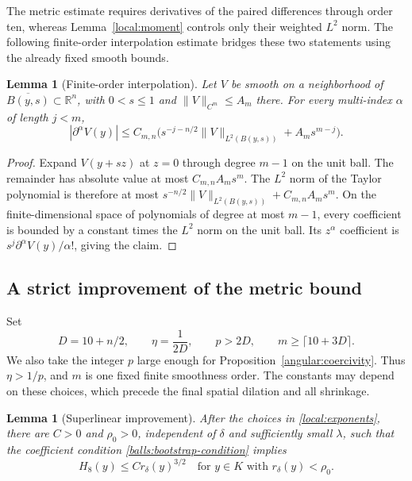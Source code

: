 \documentclass[11pt]{article}
\newtheorem{lemma}[theorem]{Lemma}
\theoremstyle{definition}
\theoremstyle{remark}
\numberwithin{equation}{section}
\begin{document}
The metric estimate requires derivatives of the paired differences
through order ten, whereas Lemma~\ref{local:moment} controls only their
weighted $L^2$ norm.  The following finite-order interpolation estimate
bridges these two statements using the already fixed smooth bounds.

\begin{lemma}[Finite-order interpolation]\label{local:interpolation}
Let $V$ be smooth on a neighborhood of $\overline{B(y,s)}\subset
\mathbb R^n$, with $0<s\leq1$ and $\|V\|_{C^m}\leq A_m$ there.
For every multi-index $\alpha$ of length $j<m$,
\begin{equation}\label{local:interpolation-estimate}
 |\partial^\alpha V(y)|\leq C_{m,n}
 \bigl(s^{-j-n/2}\|V\|_{L^2(B(y,s))}
                          +A_m s^{m-j}\bigr).
\end{equation}
\end{lemma}

\begin{proof}
Expand $V(y+sz)$ at $z=0$ through degree $m-1$ on the unit ball.
The remainder has absolute value at most $C_{m,n}A_m s^m$.
The $L^2$ norm of the Taylor polynomial is therefore at most
$s^{-n/2}\|V\|_{L^2(B(y,s))}+C_{m,n}A_m s^m$.
On the finite-dimensional space of polynomials of degree at most
$m-1$, every coefficient is bounded by a constant times the $L^2$
norm on the unit ball.  Its $z^\alpha$ coefficient is
$s^j\partial^\alpha V(y)/\alpha!$, giving the claim.
\end{proof}

\subsection{A strict improvement of the metric bound}

Set
\begin{equation}\label{local:exponents}
 D=10+n/2,\qquad \eta=\frac1{2D},\qquad
 p>2D,\qquad m\geq\lceil10+3D\rceil.
\end{equation}
We also take the integer $p$ large enough for
Proposition~\ref{angular:coercivity}.  Thus $\eta>1/p$, and $m$ is
one fixed finite smoothness order.  The constants may depend on these
choices, which precede the final spatial dilation and all shrinkage.

\begin{lemma}[Superlinear improvement]\label{local:improvement}
After the choices in \eqref{local:exponents}, there are $C>0$ and
$\rho_0>0$, independent of $\delta$ and sufficiently small $\lambda$,
such that the coefficient condition
\eqref{balls:bootstrap-condition} implies
\begin{equation}\label{local:superlinear}
 H_8(y)\leq C r_\delta(y)^{3/2}
 \quad\text{for }y\in K\text{ with }r_\delta(y)<\rho_0.
\end{equation}
\end{lemma}
\end{document}
